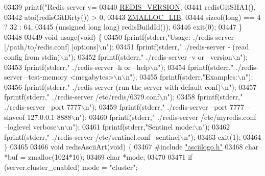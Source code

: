 \begin{DoxyCode}
{{{{{{{{{{{{{{{{{{{{{{{{{{{{{{{{{{{{{{{{{{{{{{{{{{{{{{{{{{{{{{{{{{{{{{{{{{{{{{{{{{{{{{{{{{{{{{{{{{{{{{{{{{{{{{{{{{{{{{{{{{{{{{{{{{{{{{{{{{{{{{{{{{{{{{{{{{{{{{{{{{{{{{{{{{03439     printf(\textcolor{stringliteral}{"Redis server v=%
03440         \hyperlink{version_8h_a357a0d302ef7fbb42bf2db0632b9f7fe}{REDIS\_VERSION},
03441         redisGitSHA1(),
03442         atoi(redisGitDirty()) > 0,
03443         \hyperlink{zmalloc_8h_a374c6d7cf6c9817e1243093e03df7319}{ZMALLOC\_LIB},
03444         \textcolor{keyword}{sizeof}(\textcolor{keywordtype}{long}) == 4 ? 32 : 64,
03445         (\textcolor{keywordtype}{unsigned} \textcolor{keywordtype}{long} \textcolor{keywordtype}{long}) redisBuildId());
03446     exit(0);
03447 \}
03448 
03449 \textcolor{keywordtype}{void} usage(\textcolor{keywordtype}{void}) \{
03450     fprintf(stderr,\textcolor{stringliteral}{"Usage: ./redis-server [/path/to/redis.conf] [options]\(\backslash\)n"});
03451     fprintf(stderr,\textcolor{stringliteral}{"       ./redis-server - (read config from stdin)\(\backslash\)n"});
03452     fprintf(stderr,\textcolor{stringliteral}{"       ./redis-server -v or --version\(\backslash\)n"});
03453     fprintf(stderr,\textcolor{stringliteral}{"       ./redis-server -h or --help\(\backslash\)n"});
03454     fprintf(stderr,\textcolor{stringliteral}{"       ./redis-server --test-memory <megabytes>\(\backslash\)n\(\backslash\)n"});
03455     fprintf(stderr,\textcolor{stringliteral}{"Examples:\(\backslash\)n"});
03456     fprintf(stderr,\textcolor{stringliteral}{"       ./redis-server (run the server with default conf)\(\backslash\)n"});
03457     fprintf(stderr,\textcolor{stringliteral}{"       ./redis-server /etc/redis/6379.conf\(\backslash\)n"});
03458     fprintf(stderr,\textcolor{stringliteral}{"       ./redis-server --port 7777\(\backslash\)n"});
03459     fprintf(stderr,\textcolor{stringliteral}{"       ./redis-server --port 7777 --slaveof 127.0.0.1 8888\(\backslash\)n"});
03460     fprintf(stderr,\textcolor{stringliteral}{"       ./redis-server /etc/myredis.conf --loglevel verbose\(\backslash\)n\(\backslash\)n"});
03461     fprintf(stderr,\textcolor{stringliteral}{"Sentinel mode:\(\backslash\)n"});
03462     fprintf(stderr,\textcolor{stringliteral}{"       ./redis-server /etc/sentinel.conf --sentinel\(\backslash\)n"});
03463     exit(1);
03464 \}
03465 
03466 \textcolor{keywordtype}{void} redisAsciiArt(\textcolor{keywordtype}{void}) \{
03467 \textcolor{preprocessor}{#}\textcolor{preprocessor}{include} \hyperlink{asciilogo_8h}{"asciilogo.h"}
03468     \textcolor{keywordtype}{char} *buf = zmalloc(1024*16);
03469     \textcolor{keywordtype}{char} *mode;
03470 
03471     \textcolor{keywordflow}{if} (server.cluster\_enabled) mode = \textcolor{stringliteral}{"cluster"};
}}}}}}}}}}}}}}}}}}}}}}}}}}}}}}}}}}}}}}}}}}}}}}}}}}}}}}}}}}}}}}}}}}}}}}}}}}}}}}}}}}}}}}}}}}}}}}}}}}}}}}}}}}}}}}}}}}}}}}}}}}}}}}}}}}}}}}}}}}}}}}}}}}}}}}}}}}}}}}}}}}}}}}}}}}}
\end{DoxyCode}
